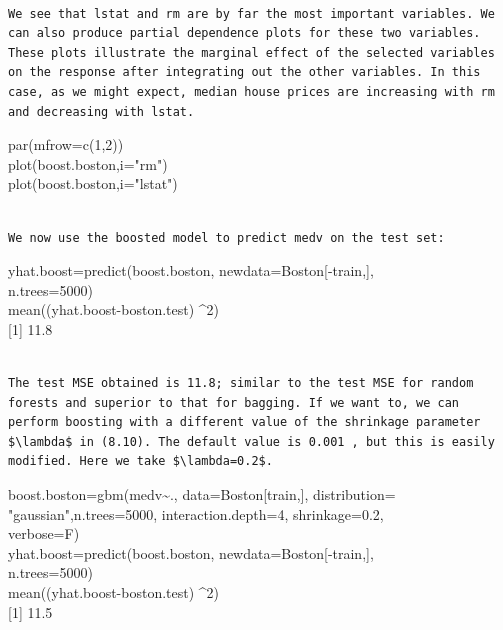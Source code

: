 \documentclass[10pt]{article}
\begin{document}
\begin{verbatim}

We see that lstat and rm are by far the most important variables. We can also produce partial dependence plots for these two variables. These plots illustrate the marginal effect of the selected variables on the response after integrating out the other variables. In this case, as we might expect, median house prices are increasing with rm and decreasing with lstat.
\end{verbatim}

\begin{displayquote}
par(mfrow=c(1,2))\\
plot(boost.boston,i="rm")\\
plot(boost.boston,i="lstat")
\end{displayquote}

\begin{verbatim}

We now use the boosted model to predict medv on the test set:
\end{verbatim}

\begin{displayquote}
yhat.boost=predict(boost.boston, newdata=Boston[-train,],\\
n.trees=5000)\\
mean((yhat.boost-boston.test) \^{}2)\\[0pt]
[1] 11.8
\end{displayquote}

\begin{verbatim}

The test MSE obtained is 11.8; similar to the test MSE for random forests and superior to that for bagging. If we want to, we can perform boosting with a different value of the shrinkage parameter $\lambda$ in (8.10). The default value is 0.001 , but this is easily modified. Here we take $\lambda=0.2$.
\end{verbatim}

\begin{displayquote}
boost.boston=gbm(medv\~{}., data=Boston[train,], distribution=\\
"gaussian",n.trees=5000, interaction.depth=4, shrinkage=0.2,\\
verbose=F)\\[0pt]
yhat.boost=predict(boost.boston, newdata=Boston[-train,],\\
n.trees=5000)\\
mean((yhat.boost-boston.test) \^{}2)\\[0pt]
[1] 11.5
\end{displayquote}
\end{document}
